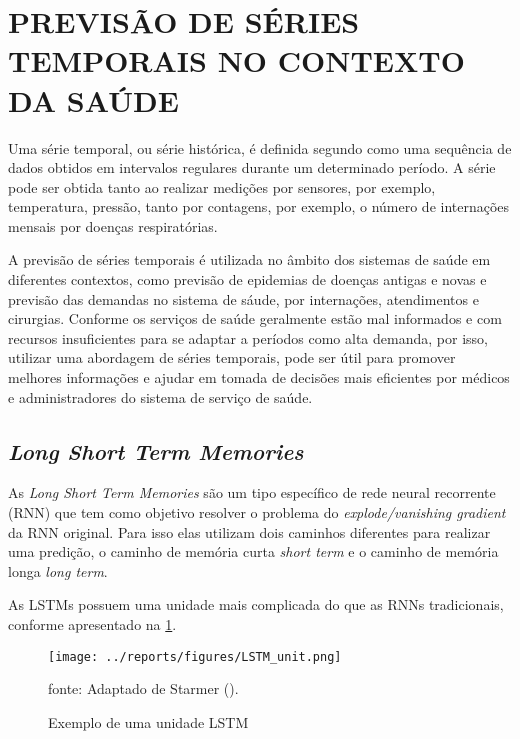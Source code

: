 \documentclass[
  12pt,		%
  a4paper,	%
  openright,%
  oneside,	%
  chapter=TITLE,		%
  section=TITLE,		%
  english,	%
  french,	%
  spanish,	%
  brazil	%
]{abntex2}
\begin{document}
    \section{PREVISÃO DE SÉRIES TEMPORAIS NO CONTEXTO DA SAÚDE}
    Uma série temporal, ou série histórica, é definida segundo \cite[]{series_temporais}
    como uma sequência de dados obtidos em intervalos regulares durante um determinado período.
    A série pode ser obtida tanto ao realizar medições por sensores, por exemplo, temperatura, pressão, 
    tanto por contagens, por exemplo, o número de internações mensais por doenças respiratórias.

    A previsão de séries temporais é utilizada no âmbito dos sistemas de saúde em diferentes contextos, como 
    previsão de epidemias de doenças antigas e novas e previsão das demandas no sistema de sáude, por internações, atendimentos e cirurgias.
    Conforme \cite[]{forcasting_health} os serviços de saúde geralmente estão mal informados 
    e com recursos insuficientes para se adaptar a períodos como alta demanda, por isso, utilizar uma abordagem
    de séries temporais, pode ser útil para promover melhores informações e ajudar em tomada de 
    decisões mais eficientes por médicos e administradores do sistema de serviço de saúde.

    \subsection{\textit{Long Short Term Memories}}
    \label{LSTM}
    As \textit{Long Short Term Memories} são um tipo específico de rede neural recorrente (RNN) que tem como objetivo
    resolver o problema do \textit{explode/vanishing gradient} da RNN original. Para isso elas utilizam dois caminhos
    diferentes para realizar uma predição, o caminho de memória curta \textit{short term} e o caminho de memória longa
    \textit{long term}.

    As LSTMs possuem uma unidade mais complicada do que as RNNs tradicionais, conforme apresentado na \ref*{lstm_unit}.
    \begin{figure}[ht]
        \centering
        \caption{Exemplo de uma unidade LSTM}
        \texttt{[image: ../reports/figures/LSTM\_unit.png]}
        \label{lstm_unit}
        \par
        {\small fonte: Adaptado de Starmer (\citeyear{statquest}).}
    \end{figure}
\end{document}
